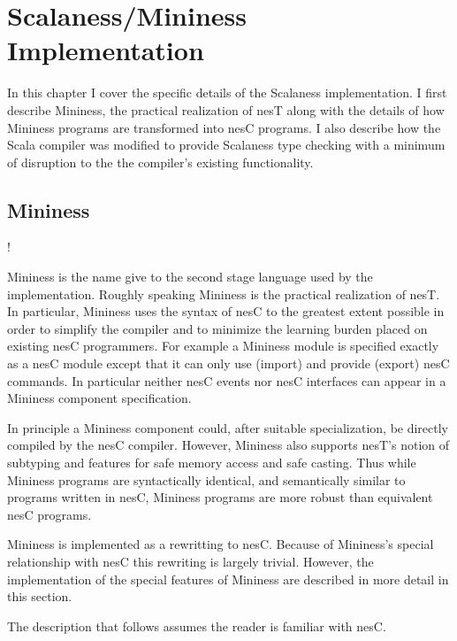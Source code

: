 \chapter{Scalaness/Mininess Implementation}
\label{chapter-scalaness-mininess-implementation}

In this chapter I cover the specific details of the Scalaness implementation. I first describe
Mininess, the practical realization of nesT along with the details of how Mininess programs are
transformed into nesC programs. I also describe how the Scala compiler was modified to provide
Scalaness type checking with a minimum of disruption to the the compiler's existing
functionality.

\section{Mininess}
\label{section-mininess}

\lstset{language=nesC}
\lstMakeShortInline!


Mininess is the name give to the second stage language used by the implementation. Roughly
speaking Mininess is the practical realization of nesT. In particular, Mininess uses the syntax
of nesC to the greatest extent possible in order to simplify the compiler and to minimize the
learning burden placed on existing nesC programmers. For example a Mininess module is specified
exactly as a nesC module except that it can only use (import) and provide (export) nesC
commands. In particular neither nesC events nor nesC interfaces can appear in a Mininess
component specification.

In principle a Mininess component could, after suitable specialization, be directly compiled by
the nesC compiler. However, Mininess also supports nesT's notion of subtyping and features for
safe memory access and safe casting. Thus while Mininess programs are syntactically identical,
and semantically similar to programs written in nesC, Mininess programs are more robust than
equivalent nesC programs.

Mininess is implemented as a rewritting to nesC. Because of Mininess's special relationship with
nesC this rewriting is largely trivial. However, the implementation of the special features of
Mininess are described in more detail in this section.

The description that follows assumes the reader is familiar with nesC.

